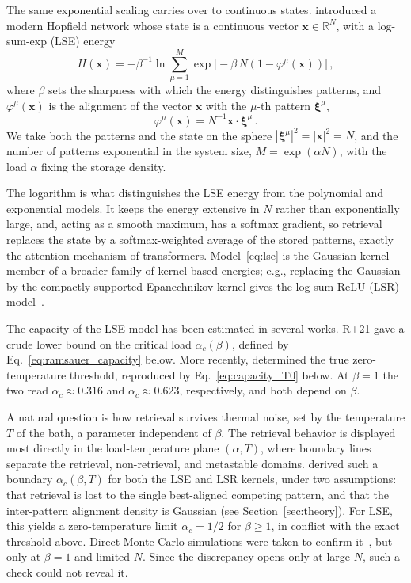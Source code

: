 \documentclass[letterpaper]{article} %
\newcommand{\bxi}{\boldsymbol{\xi}}
\newcommand{\bx}{\bm{x}}
\newcommand{\Bnet}{\beta}
\begin{document}
The same exponential scaling carries over to continuous states. \citet[][hereafter R+21]{ramsauer2021hopfield} introduced a modern Hopfield network whose state is a continuous vector $\bx \in \mathbb{R}^N$, with a log-sum-exp (LSE) energy
\begin{equation}
H(\bx) = -\Bnet^{-1}\ln\sum_{\mu=1}^{M}\exp\!\big[-\Bnet\,N (1-\varphi^\mu(\bx)) \big]\,,
\label{eq:lse}
\end{equation}
where $\Bnet$ sets the sharpness with which the energy distinguishes patterns, and $\varphi^\mu(\bx)$ is the alignment of the vector $\bx$ with the $\mu$-th pattern $\bxi^\mu$,
\begin{equation}
    \varphi^\mu(\bm{x}) = N^{-1} \bm{x} \cdot \bm{\xi}^\mu\,.
    \label{eq:alignment}
\end{equation}
We take both the patterns and the state on the sphere $|\bxi^\mu|^2 = |\bx|^2 = N$, and the number of patterns exponential in the system size, $M = \exp(\alpha N)$, with the load $\alpha$ fixing the storage density.

The logarithm is what distinguishes the LSE energy from the polynomial and exponential models. It keeps the energy extensive in $N$ rather than exponentially large, and, acting as a smooth maximum, has a softmax gradient, so retrieval replaces the state by a softmax-weighted average of the stored patterns, exactly the attention mechanism of transformers. Model~\eqref{eq:lse} is the Gaussian-kernel member of a broader family of kernel-based energies; e.g., replacing the Gaussian by the compactly supported Epanechnikov kernel gives the log-sum-ReLU (LSR) model~\citep{hoover2025dense}.

The capacity of the LSE model has been estimated in several works. R+21 gave a crude lower bound on the critical load $\alpha_c(\Bnet)$, defined by Eq.~\eqref{eq:ramsauer_capacity} below. More recently, \citet[][hereafter LM24]{lucibello2024exponential} determined the true zero-temperature threshold, reproduced by Eq.~\eqref{eq:capacity_T0} below. At $\Bnet=1$ the two read $\alpha_c \approx 0.316$ and $\alpha_c \approx 0.623$, respectively, and both depend on $\Bnet$.

A natural question is how retrieval survives thermal noise, set by the temperature $T$ of the bath, a parameter independent of $\Bnet$. The retrieval behavior is displayed most directly in the load-temperature plane $(\alpha, T)$, where boundary lines separate the retrieval, non-retrieval, and metastable domains. \citet[][hereafter PPS26]{icml2026theory} derived such a boundary $\alpha_c(\Bnet, T)$ for both the LSE and LSR kernels, under two assumptions: that retrieval is lost to the single best-aligned competing pattern, and that the inter-pattern alignment density is Gaussian (see Section~\ref{sec:theory}). For LSE, this yields a zero-temperature limit $\alpha_c = 1/2$ for $\Bnet\ge 1$, in conflict with the exact threshold above. Direct Monte Carlo simulations were taken to confirm it~\citep{iclr2026mc}, but only at $\Bnet=1$ and limited $N$. Since the discrepancy opens only at large $N$, such a check could not reveal it.
\end{document}
